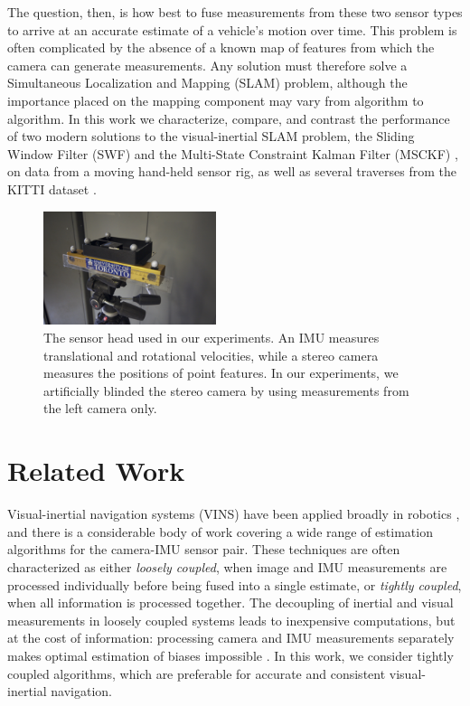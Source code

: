 \documentclass[letterpaper, 10 pt, conference]{ieeeconf}  %
\begin{document}
The question, then, is how best to fuse measurements from these two sensor types to arrive at an accurate estimate of a vehicle's motion over time.
This problem is often complicated by the absence of a known map of features from which the camera can generate measurements.
Any solution must therefore solve a Simultaneous Localization and Mapping (SLAM) problem, although the importance placed on the mapping component may vary from algorithm to algorithm.
In this work we characterize, compare, and contrast the performance of two modern solutions to the visual-inertial SLAM problem, the Sliding Window Filter (SWF) and the Multi-State Constraint Kalman Filter (MSCKF) \cite{Mourikis:2006:TechReport,Mourikis:2007:ICRA}, on data from a moving hand-held sensor rig, as well as several traverses from the KITTI dataset \cite{Geiger:2013:IJRR}.

\begin{figure}[t]
    \vspace{0.25cm}
    \centering
    \includegraphics[width=0.45\textwidth]{figs/sensorhead}
    \caption{The sensor head used in our experiments. An IMU measures translational and rotational velocities, while a stereo camera measures the positions of point features. In our experiments, we artificially blinded the stereo camera by using measurements from the left camera only.}
    \label{fig:sensorhead}
\end{figure}


\section{Related Work} \label{sec:relatedwork}

Visual-inertial navigation systems (VINS) have been applied broadly in robotics \cite{Mourikis:2007:ICRA, Sibley:2010:JFR, Huster:2002:OC, Kottas:2013:IROS, Kim:2007:RSS, Li:2013coa,  You:2001:VR}, and there is a considerable body of work covering a wide range of estimation algorithms for the camera-IMU sensor pair. 
These techniques are often characterized as either \textit{loosely coupled}, when image and IMU measurements are processed individually before being fused into a single estimate, or \textit{tightly coupled}, when all information is processed together.  
The decoupling of inertial and visual measurements in loosely coupled systems leads to inexpensive computations, but at the cost of information: processing camera and IMU measurements separately makes optimal estimation of biases impossible \cite{Li:2013coa}. 
In this work, we consider tightly coupled algorithms, which are preferable for accurate and consistent visual-inertial navigation. 
\end{document}
